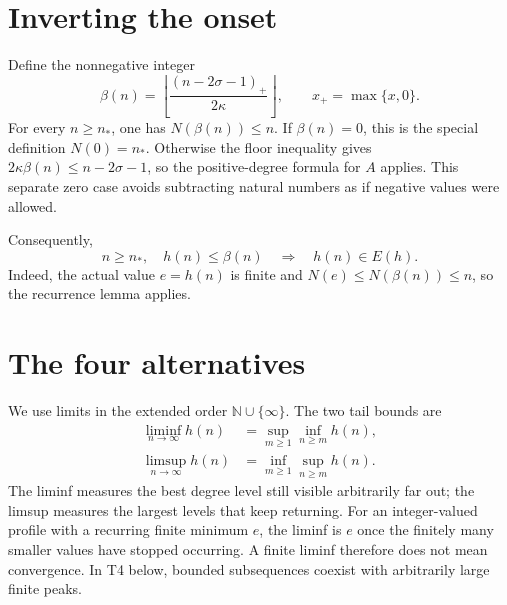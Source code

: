 \documentclass[11pt,a4paper,oneside,openany]{book}
\theoremstyle{definition}\newtheorem{definition}[theorem]{Definition}
\theoremstyle{remark}\newtheorem{remark}[theorem]{Remark}
\newcommand{\NN}{\mathbb N}\newcommand{\N}{\mathbb N}\newcommand{\Z}{\mathbb Z}\newcommand{\Q}{\mathbb Q}\newcommand{\Fp}{\mathbb F_p}
\numberwithin{equation}{chapter}
\begin{document}
\section{Inverting the onset}
Define the nonnegative integer
\begin{equation}\label{tx:eq:inverse-onset}
 \beta(n)=\left\lfloor\frac{(n-2\sigma-1)_+}{2\kappa}\right\rfloor,
                         \qquad x_+=\max\{x,0\}.
\end{equation}
For every $n\ge n_*$, one has $N(\beta(n))\le n$. If $\beta(n)=0$,
this is the special definition $N(0)=n_*$. Otherwise the floor inequality
gives $2\kappa\beta(n)\le n-2\sigma-1$, so the positive-degree formula
for $A$ applies. This separate zero case avoids subtracting natural
numbers as if negative values were allowed.

Consequently,
\begin{equation}\label{tx:eq:low-value-recurs}
 n\ge n_*,\quad h(n)\le\beta(n)
                   \quad\Longrightarrow\quad h(n)\in E(h).
\end{equation}
Indeed, the actual value $e=h(n)$ is finite and
$N(e)\le N(\beta(n))\le n$, so the recurrence lemma applies.

\section{The four alternatives}
We use limits in the extended order $\NN\cup\{\infty\}$.
The two tail bounds are
\[
 \begin{aligned}
 \liminf_{n\to\infty}h(n)&=\sup_{m\ge1}\inf_{n\ge m}h(n),\\
 \limsup_{n\to\infty}h(n)&=\inf_{m\ge1}\sup_{n\ge m}h(n).
 \end{aligned}
\]
The liminf measures the best degree level still visible arbitrarily
far out; the limsup measures the largest levels that keep returning.
For an integer-valued profile with a recurring finite minimum $e$,
the liminf is $e$ once the finitely many smaller values have stopped
occurring. A finite liminf therefore does not mean convergence.
In T4 below, bounded subsequences coexist with arbitrarily large
finite peaks.
\end{document}
